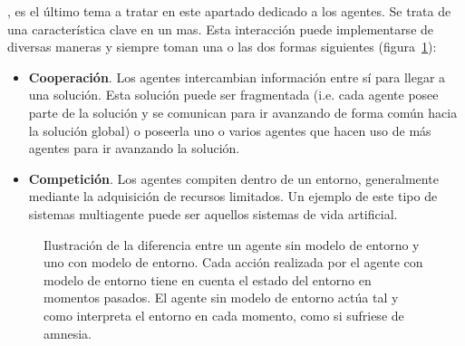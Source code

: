 , es el último tema a tratar en este apartado dedicado a los agentes. Se trata de una característica clave en un \gls{mas}. Esta interacción puede implementarse de diversas maneras y siempre toman una o las dos formas siguientes (figura~\ref{fig:communication-between-agents-in-mass}):

\begin{itemize}
	\item \textbf{Cooperación}. Los agentes intercambian información entre sí para llegar a una solución. Esta solución puede ser fragmentada (i.e. cada agente posee parte de la solución y se comunican para ir avanzando de forma común hacia la solución global) o poseerla uno o varios agentes que hacen uso de más agentes para ir avanzando la solución.
	\item \textbf{Competición}. Los agentes compiten dentro de un entorno, generalmente mediante la adquisición de recursos limitados. Un ejemplo de este tipo de sistemas multiagente puede ser aquellos sistemas de vida artificial.
\end{itemize}

\begin{figure}
	\caption{Ilustración de la diferencia entre un agente sin modelo de entorno y uno con modelo de entorno. Cada acción realizada por el agente con modelo de entorno tiene en cuenta el estado del entorno en momentos pasados. El agente sin modelo de entorno actúa tal y como interpreta el entorno en cada momento, como si sufriese de amnesia.}
	\label{fig:communication-between-agents-in-mass}
\end{figure}

